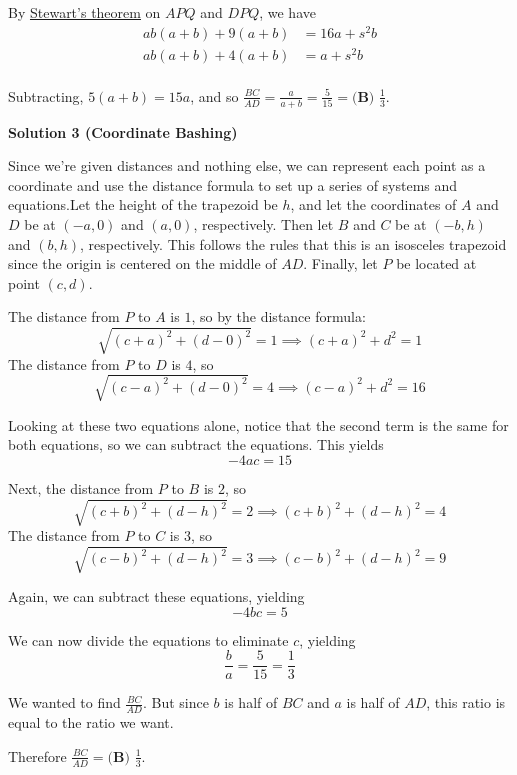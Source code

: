 \begin{enumerate}
 By \href{https://artofproblemsolving.com/wiki/index.php?title=Stewart\%27s\_theorem}{Stewart's theorem} on $APQ$ and $DPQ$, we have 
 \begin{align*} ab(a+b) + 9(a+b) &= 16a + s^2b \\ ab(a+b) + 4(a+b) &= a + s^2b \\ \end{align*}


 Subtracting, $5(a+b) = 15a$, and so $\frac{BC}{AD} = \frac{a}{a+b} = \frac{5}{15} = \boxed{\textbf{(B) }\frac{1}{3}}$.

 



\textbf{Solution 3 (Coordinate Bashing)}

Since we're given distances and nothing else, we can represent each point as a coordinate and use the distance formula to set up a series of systems and equations.Let the height of the trapezoid be $h$, and let the coordinates of $A$ and $D$ be at $(-a,0)$ and $(a,0)$, respectively. Then let $B$ and $C$ be at $(-b,h)$ and $(b,h)$, respectively. This follows the rules that this is an isosceles trapezoid since the origin is centered on the middle of $AD$. Finally, let $P$ be located at point $(c,d)$.

 The distance from $P$ to $A$ is $1$, so by the distance formula: 
 \[\sqrt{(c+a)^2+(d-0)^2} = 1 \implies (c+a)^2+d^2 = 1\]The distance from $P$ to $D$ is $4$, so 
 \[\sqrt{(c-a)^2+(d-0)^2} = 4 \implies (c-a)^2+d^2 = 16\]

 Looking at these two equations alone, notice that the second term is the same for both equations, so we can subtract the equations. This yields 
 \[-4ac = 15\]

 Next, the distance from $P$ to $B$ is $2$, so 
 \[\sqrt{(c+b)^2+(d-h)^2} = 2 \implies (c+b)^2+(d-h)^2 = 4\]The distance from $P$ to $C$ is $3$, so 
 \[\sqrt{(c-b)^2+(d-h)^2} = 3 \implies (c-b)^2+(d-h)^2 = 9\]

 Again, we can subtract these equations, yielding 
 \[-4bc = 5\]

 We can now divide the equations to eliminate $c$, yielding 
 \[\frac{b}{a} = \frac{5}{15} = \frac{1}{3}\]

 We wanted to find $\frac{BC}{AD}$. But since $b$ is half of $BC$ and $a$ is half of $AD$, this ratio is equal to the ratio we want.

 Therefore $\frac{BC}{AD} = \boxed{\textbf{(B) }\frac{1}{3}}$.

 




\end{enumerate}
